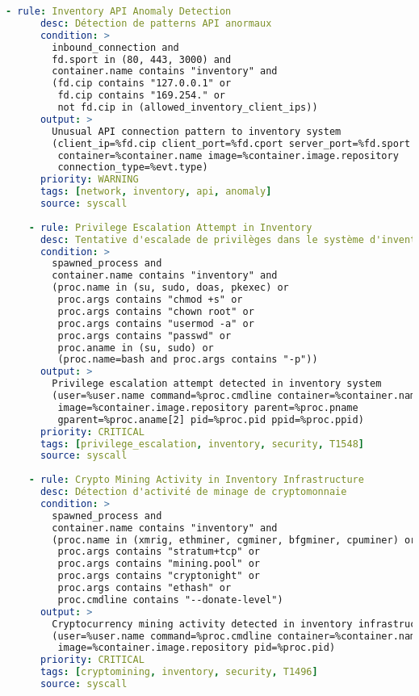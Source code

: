 \documentclass[12pt,a4paper]{report}
\begin{document}
\begin{lstlisting}[language=YAML, caption=Configuration Falco avancée pour conteneurs]
    - rule: Inventory API Anomaly Detection
      desc: Détection de patterns API anormaux
      condition: >
        inbound_connection and 
        fd.sport in (80, 443, 3000) and
        container.name contains "inventory" and
        (fd.cip contains "127.0.0.1" or
         fd.cip contains "169.254." or
         not fd.cip in (allowed_inventory_client_ips))
      output: >
        Unusual API connection pattern to inventory system
        (client_ip=%fd.cip client_port=%fd.cport server_port=%fd.sport
         container=%container.name image=%container.image.repository
         connection_type=%evt.type)
      priority: WARNING
      tags: [network, inventory, api, anomaly]
      source: syscall
    
    - rule: Privilege Escalation Attempt in Inventory
      desc: Tentative d'escalade de privilèges dans le système d'inventaire
      condition: >
        spawned_process and 
        container.name contains "inventory" and
        (proc.name in (su, sudo, doas, pkexec) or
         proc.args contains "chmod +s" or
         proc.args contains "chown root" or
         proc.args contains "usermod -a" or
         proc.args contains "passwd" or
         proc.aname in (su, sudo) or
         (proc.name=bash and proc.args contains "-p"))
      output: >
        Privilege escalation attempt detected in inventory system
        (user=%user.name command=%proc.cmdline container=%container.name
         image=%container.image.repository parent=%proc.pname 
         gparent=%proc.aname[2] pid=%proc.pid ppid=%proc.ppid)
      priority: CRITICAL
      tags: [privilege_escalation, inventory, security, T1548]
      source: syscall
    
    - rule: Crypto Mining Activity in Inventory Infrastructure
      desc: Détection d'activité de minage de cryptomonnaie
      condition: >
        spawned_process and 
        container.name contains "inventory" and
        (proc.name in (xmrig, ethminer, cgminer, bfgminer, cpuminer) or
         proc.args contains "stratum+tcp" or
         proc.args contains "mining.pool" or
         proc.args contains "cryptonight" or
         proc.args contains "ethash" or
         proc.cmdline contains "--donate-level")
      output: >
        Cryptocurrency mining activity detected in inventory infrastructure
        (user=%user.name command=%proc.cmdline container=%container.name
         image=%container.image.repository pid=%proc.pid)
      priority: CRITICAL
      tags: [cryptomining, inventory, security, T1496]
      source: syscall
    

\end{lstlisting}
\end{document}
